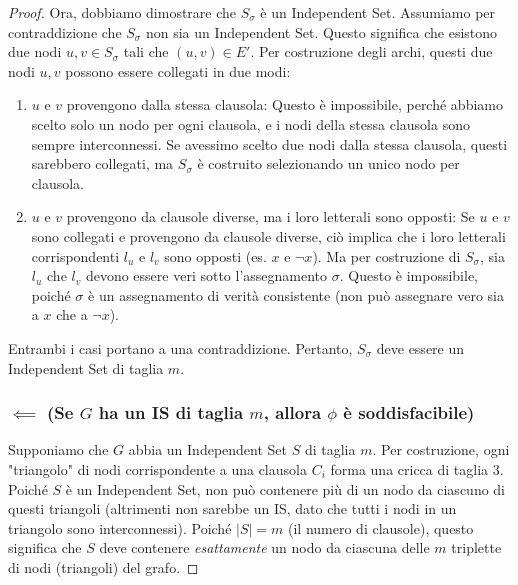 \documentclass[a4paper]{article}
\theoremstyle{definition} %
\theoremstyle{definition} %
\begin{document}
\begin{proof}
Ora, dobbiamo dimostrare che $S_\sigma$ è un Independent Set.
Assumiamo per contraddizione che $S_\sigma$ non sia un Independent Set. Questo significa che esistono due nodi $u, v \in S_\sigma$ tali che $(u, v) \in E'$.
Per costruzione degli archi, questi due nodi $u, v$ possono essere collegati in due modi:
\begin{enumerate}
    \item $u$ e $v$ provengono dalla stessa clausola: Questo è impossibile, perché abbiamo scelto solo un nodo per ogni clausola, e i nodi della stessa clausola sono sempre interconnessi. Se avessimo scelto due nodi dalla stessa clausola, questi sarebbero collegati, ma $S_\sigma$ è costruito selezionando un unico nodo per clausola.
    \item $u$ e $v$ provengono da clausole diverse, ma i loro letterali sono opposti: Se $u$ e $v$ sono collegati e provengono da clausole diverse, ciò implica che i loro letterali corrispondenti $l_u$ e $l_v$ sono opposti (es. $x$ e $\neg x$). Ma per costruzione di $S_\sigma$, sia $l_u$ che $l_v$ devono essere veri sotto l'assegnamento $\sigma$. Questo è impossibile, poiché $\sigma$ è un assegnamento di verità consistente (non può assegnare vero sia a $x$ che a $\neg x$).
\end{enumerate}
Entrambi i casi portano a una contraddizione. Pertanto, $S_\sigma$ deve essere un Independent Set di taglia $m$.

\subsubsection{$\impliedby$ (Se $G$ ha un IS di taglia $m$, allora $\phi$ è soddisfacibile)}
Supponiamo che $G$ abbia un Independent Set $S$ di taglia $m$.
Per costruzione, ogni "triangolo" di nodi corrispondente a una clausola $C_i$ forma una cricca di taglia 3. Poiché $S$ è un Independent Set, non può contenere più di un nodo da ciascuno di questi triangoli (altrimenti non sarebbe un IS, dato che tutti i nodi in un triangolo sono interconnessi).
Poiché $|S|=m$ (il numero di clausole), questo significa che $S$ deve contenere \emph{esattamente} un nodo da ciascuna delle $m$ triplette di nodi (triangoli) del grafo.


\end{proof}
\end{document}
